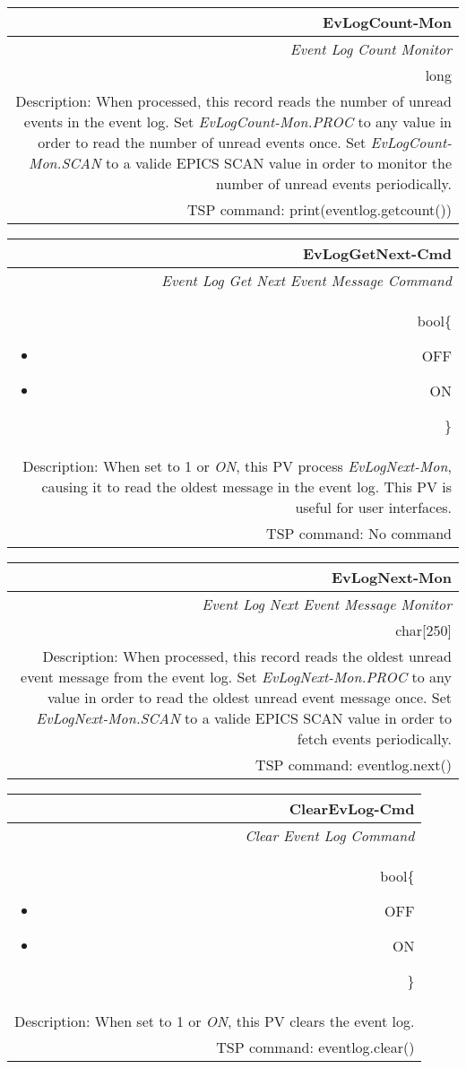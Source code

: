 \documentclass[openany]{article}
\begin{document}
		\begin{tabular}{N}
			\hline
			\bfseries EvLogCount-Mon\label{pv:evlogcount-mon} \\ \hline
			\emph{Event Log Count Monitor} \\
			long \\
			Description: When processed, this record reads the number of unread events in the event log. Set \emph{EvLogCount-Mon.PROC} to any value in order to read the number of unread events once. Set \emph{EvLogCount-Mon.SCAN} to a valide EPICS SCAN value in order to monitor the number of unread events periodically. \\
			TSP command: print(eventlog.getcount())
		\end{tabular}

		\begin{tabular}{N}
			\hline
			\bfseries EvLogGetNext-Cmd\label{pv:evloggetnext-mon} \\ \hline
			\emph{Event Log Get Next Event Message Command} \\
			bool\{\begin{itemize}[noitemsep]
				\small
				\item[] OFF
				\item[] ON
			\end{itemize}\} \\
			Description: When set to 1 or \emph{ON}, this PV process \emph{EvLogNext-Mon}, causing it to read the oldest message in the event log. This PV is useful for user interfaces. \\
			TSP command: No command
		\end{tabular}

		\begin{tabular}{N}
			\hline
			\bfseries EvLogNext-Mon\label{pv:evlognext-mon} \\ \hline
			\emph{Event Log Next Event Message Monitor} \\
			char[250] \\
			Description: When processed, this record reads the oldest unread event message from the event log. Set \emph{EvLogNext-Mon.PROC} to any value in order to read the oldest unread event message once. Set \emph{EvLogNext-Mon.SCAN} to a valide EPICS SCAN value in order to fetch events periodically. \\
			TSP command: eventlog.next()
		\end{tabular}

		\begin{tabular}{N}
			\hline
			\bfseries ClearEvLog-Cmd\label{pv:clearevlog-cmd} \\ \hline
			\emph{Clear Event Log Command} \\
			bool\{\begin{itemize}[noitemsep]
				\small
				\item[] OFF
				\item[] ON
			\end{itemize}\} \\
			Description: When set to 1 or \emph{ON}, this PV clears the event log. \\
			TSP command: eventlog.clear()
		\end{tabular}
\end{document}
